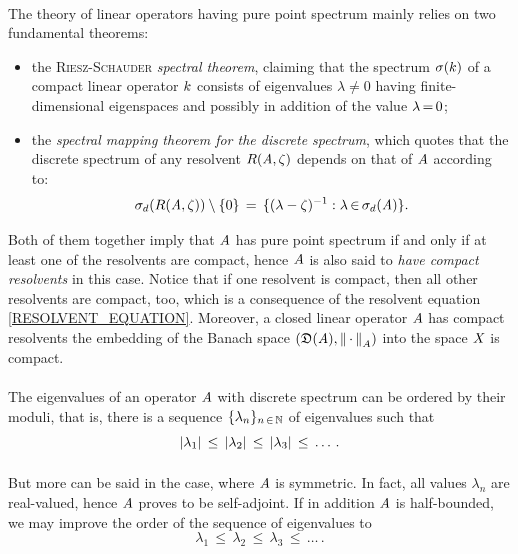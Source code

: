 \documentclass[11pt,twoside]{article}
\begin{document}
\begin{itemize}[leftmargin=4mm,itemsep=5pt]
\paragraph{} %
The theory of linear operators having pure point spectrum
mainly relies on two fundamental theorems:

\begin{itemize}[leftmargin=9mm]
\item[(a)]
the \textsc{Riesz-Schauder} \textit{spectral theorem},
claiming that the spectrum $\sigma(k)$
of a compact linear operator $k$ consists of eigen\-values
$\lambda \neq 0$ having finite-dimensional eigenspaces
and possibly in addition of the value $\lambda {\,=\,} 0$; 

\item[(b)]
the \textit{spectral mapping theorem for the discrete spectrum},
which quotes that
the discrete spectrum of any resolvent $R(\mathit{A},\zeta)$ depends on that
of $\mathit{A}$ according to:
\[
\sigma_d(R(\mathit{A},\zeta)) \setminus \{0\} \,=\,
\{(\lambda-\zeta)^{-1}: \lambda {\,\in\,} \sigma_d(\mathit{A})\}.
\]
\end{itemize}

Both of them together imply that $\mathit{A}$ has pure point spectrum
if and only if at least one of the resolvents are compact,
hence $\mathit{A}$ is also said to \textit{have compact resolvents} in this case.
Notice that if one resolvent is compact,
then all other resolvents are compact,
too,
which is a consequence of the resolvent equation \eqref{RESOLVENT_EQUATION}.
Moreover,
a closed linear operator $\mathit{A}$ has compact resolvents
\iff the embedding of the Banach space $(\mathfrak{D}(\mathit{A}),\left\lVert \,\cdot\, \right\rVert_A)$
into the space $\mathit{X}$ is compact.

\paragraph{} %
The eigenvalues of an operator $\mathit{A}$ with discrete spectrum
can be ordered by their moduli,
that is,
there is a sequence $\{ \lambda_n \}_{n {\,\in\,} {\mathbb{N}}}$ of eigen\-values
such that
\[
\abs{\lambda_1} \,\leq\, \abs{\lambda_2} \,\leq\, \abs{\lambda_3} \,\leq\,
\ldots \, .
\]

\paragraph{} %
But more can be said in the case,
where $\mathit{A}$ is symmetric.
In fact,
all values $\lambda_n$ are real-valued,
hence $\mathit{A}$ proves to be self-adjoint.
If in addition $\mathit{A}$ is half-bounded,
we may improve the order of the sequence of eigenvalues to
\[
\lambda_1 \,\leq\, \lambda_2 \,\leq\, \lambda_3 \,\leq\, \ldots \, .
\]


\end{itemize}
\end{document}
